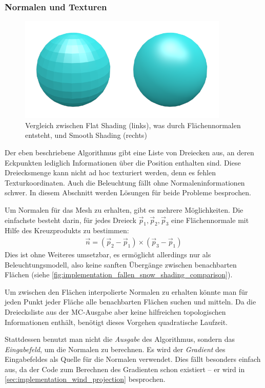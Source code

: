\subsubsection{Normalen und Texturen}

\begin{figure}[h]
\centering
\includegraphics[width=10cm]{images/shading_comparison}
\caption{Vergleich zwischen Flat Shading (links), was durch Flächennormalen entsteht, und Smooth Shading (rechts)}
\label{fig:implementation_fallen_snow_shading_comparison}
\end{figure}

Der eben beschriebene Algorithmus gibt eine Liste von Dreiecken aus,
an deren Eckpunkten lediglich Informationen über die Position
enthalten sind. Diese Dreiecksmenge kann nicht ad hoc texturiert
werden, denn es fehlen Texturkoordinaten. Auch die Beleuchtung fällt
ohne Normaleninformationen schwer. In diesem Abschnitt werden Lösungen
für beide Probleme besprochen.

Um Normalen für das Mesh zu erhalten, gibt es mehrere
Möglichkeiten. Die einfachste besteht darin, für jedes Dreieck
$\vec{p}_1,\vec{p}_2,\vec{p}_3$ eine Flächennormale mit Hilfe des Kreuzprodukts zu bestimmen:
\begin{align}
\vec{n} = (\vec{p}_2 - \vec{p}_1) \times (\vec{p}_3 - \vec{p}_1)
\end{align}
Dies ist ohne Weiteres umsetzbar, es ermöglicht allerdings nur
 als Beleuchtungsmodell, also keine
sanften Übergänge zwischen benachbarten Flächen (siehe
\autoref{fig:implementation_fallen_snow_shading_comparison}).

Um zwischen den Flächen interpolierte Normalen zu erhalten könnte man
für jeden Punkt jeder Fläche alle benachbarten Flächen suchen und
mitteln. Da die Dreiecksliste aus der MC-Ausgabe aber keine
hilfreichen topologischen Informationen enthält, benötigt dieses
Vorgehen quadratische Laufzeit.

Stattdessen benutzt man nicht die \emph{Ausgabe} des Algorithmus,
sondern das \emph{Eingabefeld}, um die Normalen zu berechnen. Es wird
der \emph{Gradient} des Eingabefeldes als Quelle für die Normalen
verwendet. Dies fällt besonders einfach aus, da der Code zum Berechnen
des Gradienten schon existiert -- er wird in
\autoref{sec:implementation_wind_projection} besprochen.

